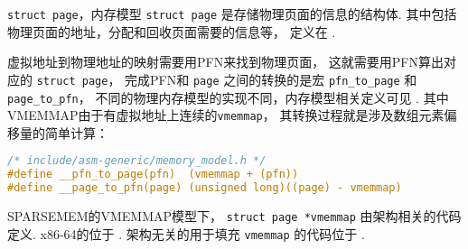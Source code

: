 \begin{readsrcbox}{\lstinline{struct page}，内存模型}
	\lstinline{struct page} 是存储物理页面的信息的结构体.
	其中包括物理页面的地址，分配和回收页面需要的信息等，
	定义在 .

	虚拟地址到物理地址的映射需要用PFN来找到物理页面，
	这就需要用PFN算出对应的 \lstinline{struct page}，
	完成PFN和 \lstinline{page} 之间的转换的是宏
	\lstinline{pfn_to_page} 和 \lstinline{page_to_pfn}，
	不同的物理内存模型的实现不同，内存模型相关定义可见
	.
	其中VMEMMAP由于有虚拟地址上连续的\lstinline{vmemmap}，
	其转换过程就是涉及数组元素偏移量的简单计算：
	\begin{lstlisting}[language=C]
/* include/asm-generic/memory_model.h */
#define __pfn_to_page(pfn)	(vmemmap + (pfn))
#define __page_to_pfn(page)	(unsigned long)((page) - vmemmap)
\end{lstlisting}

	SPARSEMEM的VMEMMAP模型下，
	\lstinline{struct page *vmemmap} 由架构相关的代码定义.
	x86-64的位于 .
	架构无关的用于填充 \lstinline{vmemmap} 的代码位于
	.
\end{readsrcbox}

